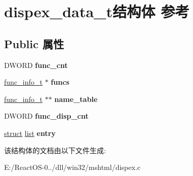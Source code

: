 \hypertarget{structdispex__data__t}{}\section{dispex\+\_\+data\+\_\+t结构体 参考}
\label{structdispex__data__t}
\subsection*{Public 属性}
\begin{DoxyCompactItemize}
\item 
\mbox{\label{structdispex__data__t_a81b2d715834f0bcca6ff3d0a6efea6e0}} 
D\+W\+O\+RD {\bfseries func\+\_\+cnt}
\item 
\mbox{\label{structdispex__data__t_a2c1a3f67c0bcd8990082ae7a3970c156}} 
\hyperlink{structfunc__info__t}{func\+\_\+info\+\_\+t} $\ast$ {\bfseries funcs}
\item 
\mbox{\label{structdispex__data__t_a89b269a25c41c712ae57c48cc6854157}} 
\hyperlink{structfunc__info__t}{func\+\_\+info\+\_\+t} $\ast$$\ast$ {\bfseries name\+\_\+table}
\item 
\mbox{\label{structdispex__data__t_a55c78ac4caf276c89ca04631c65e85c1}} 
D\+W\+O\+RD {\bfseries func\+\_\+disp\+\_\+cnt}
\item 
\mbox{\label{structdispex__data__t_acbadf0d2f1b8e454803e0c05124c99b0}} 
\hyperlink{interfacestruct}{struct} \hyperlink{classlist}{list} {\bfseries entry}
\end{DoxyCompactItemize}


该结构体的文档由以下文件生成\+:\begin{DoxyCompactItemize}
\item 
E\+:/\+React\+O\+S-\/0../dll/win32/mshtml/dispex.\+c\end{DoxyCompactItemize}
